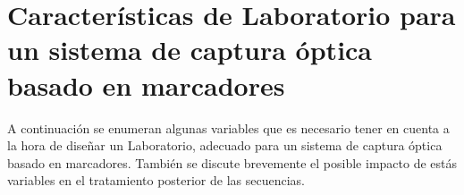 %
%
%
%
%
%
%
%
%


\section{Características de Laboratorio para un sistema de captura óptica basado en marcadores}
\label{seccion_Caracteristicas_Laboratorio}
 
A continuación se enumeran algunas variables que es necesario tener en cuenta a la hora de diseñar un Laboratorio, adecuado para un sistema de captura óptica basado en marcadores. También se discute brevemente el posible impacto de estás variables en el tratamiento posterior de las secuencias.

